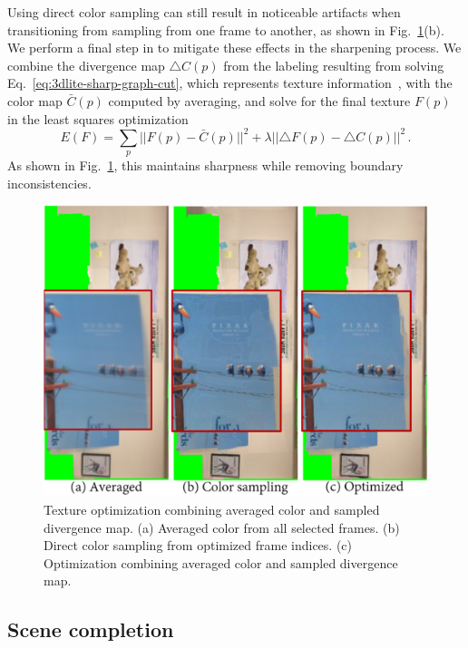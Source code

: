 Using direct color sampling can still result in noticeable artifacts when transitioning from sampling from one frame to another, as shown in Fig.~\ref{fig:3dlite-sharp-poisson}(b).
We perform a final step in to mitigate these effects in the sharpening process.
We combine the divergence map $\triangle C(p)$ from the labeling resulting from solving Eq.~\ref{eq:3dlite-sharp-graph-cut}, which represents texture information~\cite{perez2003poisson}, with the color map $\bar{C}(p)$ computed by averaging, and solve for the final texture $F(p)$ in the least squares optimization
\begin{equation}
E(F) = \sum_p ||F(p) - \bar{C}(p)||^2 + \lambda ||\triangle F(p) - \triangle C(p)||^2\,.
\label{eq:sharp-poisson}
\end{equation}
As shown in Fig.~\ref{fig:3dlite-sharp-poisson}, this maintains sharpness while removing boundary inconsistencies.

\begin{figure}
\centering
\includegraphics[width=0.8\linewidth]{3dlite/fig6.png}
\caption{Texture optimization combining averaged color and sampled divergence map. (a) Averaged color from all selected frames. (b) Direct color sampling from optimized frame indices. (c) Optimization combining averaged color and sampled divergence map.}
\label{fig:3dlite-sharp-poisson}
\end{figure}

\subsection{Scene completion}
\label{sec:completion}


